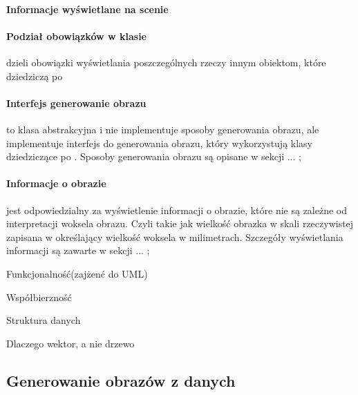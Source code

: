 \paragraph{Informacje wyświetlane na scenie}



\paragraph{Podział obowiązków w klasie}
 dzieli obowiązki wyświetlania poszczególnych rzeczy innym obiektom, które dziedziczą po \sokarclass

\paragraph{Interfejs generowanie obrazu}
 to klasa abstrakcyjna i nie implementuje sposoby generowania obrazu, ale implementuje interfejs do generowania obrazu, który wykorzystują klasy dziedziczące po .
Sposoby generowania obrazu są opisane w sekcji ... ;

\paragraph{Informacje o obrazie}
 jest odpowiedzialny za wyświetlenie informacji o obrazie, które nie są zależne od interpretacji woksela obrazu.
Czyli takie jak wielkość obrazka w skali rzeczywistej zapisana w  określający wielkość woksela w milimetrach.
Szczegóły wyświetlania informacji są zawarte w sekcji ... ;

Funkcjonalność(zajżenć do UML)

Współbierzność

Struktura danych

Dlaczego wektor, a nie drzewo

\subsection{Generowanie obrazów z danych}
